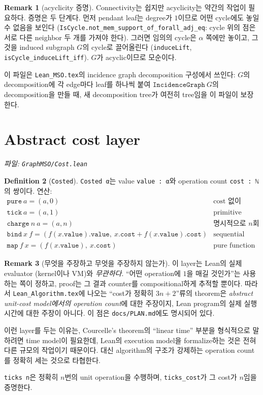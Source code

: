 \documentclass[11pt]{article}
\theoremstyle{definition}
\newtheorem{definition}{Definition}[section]
\newtheorem{remark}[definition]{Remark}
\theoremstyle{plain}
\newcommand{\lean}[1]{\texttt{#1}}
\newcommand{\leanfile}[1]{\texttt{#1}}
\begin{document}
\begin{remark}[acyclicity 증명]
\label{basics:rem:pendantacyclic}
Connectivity는 쉽지만 acyclicity는 약간의 작업이 필요하다. 증명은 두 단계다.
먼저 pendant leaf는 degree가 $1$이므로 어떤 cycle에도 놓일 수 없음을 보인다
(\lean{IsCycle.not\_mem\_support\_of\_forall\_adj\_eq}: cycle 위의 점은
서로 다른 neighbor 두 개를 가져야 한다). 그러면 임의의 cycle은 $\alpha$ 쪽에만
놓이고, 그것을 induced subgraph $G$의 cycle로 끌어올린다
(\lean{induceLift}, \lean{isCycle\_induceLift\_iff}). $G$가 acyclic이므로
모순이다.
\end{remark}

이 파일은 \leanfile{Lean\_MSO.tex}의 incidence graph decomposition 구성에서
쓰인다: $G$의 decomposition에 각 edge마다 leaf를 하나씩 붙여
$\lean{IncidenceGraph}\ G$의 decomposition을 만들 때, 새 decomposition tree가
여전히 tree임을 이 파일이 보장한다.

\section{Abstract cost layer}
\label{basics:sec:cost}

\emph{파일: \leanfile{GraphMSO/Cost.lean}}

\begin{definition}[\lean{Costed}]
\label{basics:def:costed}
\lean{Costed α}는 value \lean{value : α}와 operation count \lean{cost : ℕ}의
쌍이다. 연산:
\[
\begin{array}{ll}
  \lean{pure}\ a = (a, 0) & \text{cost 없이 value 반환} \\
  \lean{tick}\ a = (a, 1) & \text{primitive operation 1회} \\
  \lean{charge}\ n\ a = (a, n) & \text{명시적으로 $n$회} \\
  \lean{bind}\ x\ f = (f(x.\lean{value}).\lean{value},\ x.\lean{cost} + f(x.\lean{value}).\lean{cost}) & \text{sequential composition} \\
  \lean{map}\ f\ x = (f(x.\lean{value}),\ x.\lean{cost}) & \text{pure function 적용}
\end{array}
\]
\end{definition}

\begin{remark}[무엇을 주장하고 무엇을 주장하지 않는가]
\label{basics:rem:costmeaning}
이 layer는 Lean의 실제 evaluator (kernel이나 VM)와 \emph{무관하다}. ``어떤
operation에 $1$을 매길 것인가''는 사용하는 쪽이 정하고, proof는 그 결과
counter를 compositional하게 추적할 뿐이다. 따라서
\leanfile{Lean\_Algorithm.tex}에 나오는 ``cost가 정확히 $3n+2$''류의 theorem은
\emph{abstract unit-cost model에서의 operation count}에 대한 주장이지, Lean
program의 실제 실행 시간에 대한 주장이 아니다. 이 점은
\leanfile{docs/PLAN.md}에도 명시되어 있다.

이런 layer를 두는 이유는, Courcelle's theorem의 ``linear time'' 부분을
형식적으로 말하려면 time model이 필요한데, Lean의 execution model을
formalize하는 것은 전혀 다른 규모의 작업이기 때문이다. 대신 algorithm의 구조가
강제하는 operation count를 정확히 세는 것으로 타협한다.
\end{remark}

\lean{ticks n}은 정확히 $n$번의 unit operation을 수행하며, \lean{ticks\_cost}가
그 cost가 $n$임을 증명한다.
\end{document}
